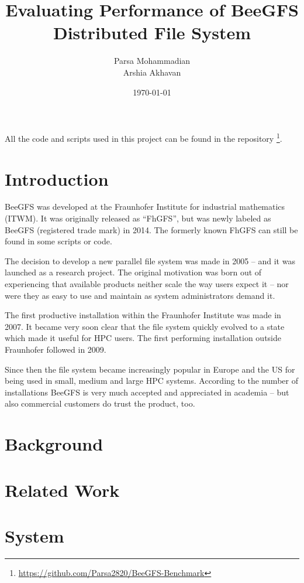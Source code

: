 \documentclass{article}
\title{Evaluating Performance of BeeGFS Distributed File System}
\author{Parsa Mohammadian\\ Arshia Akhavan}
\date{\today}
\begin{document}
\maketitle

\noindent All the code and scripts used in this project can be found in the repository \footnote{\url{https://github.com/Parsa2820/BeeGFS-Benchmark}}.

\tableofcontents

\section{Introduction}
BeeGFS was developed at the Fraunhofer Institute for industrial mathematics (ITWM). It was originally released as “FhGFS”, but was newly labeled as BeeGFS (registered trade mark) in 2014. The formerly known FhGFS can still be found in some scripts or code. \cite{heichler2014introduction}

The decision to develop a new parallel file system was made in 2005 – and it was launched as a research project. The original motivation was born out of experiencing that available products neither scale the way users expect it – nor were they as easy to use and maintain as system administrators demand it. \cite{heichler2014introduction}

The first productive installation within the Fraunhofer Institute was made in 2007. It became very soon clear that the file system quickly evolved to a state which made it useful for HPC users. The first performing installation outside Fraunhofer followed in 2009. \cite{heichler2014introduction}

Since then the file system became increasingly popular in Europe and the US for being used in small, medium and large HPC systems. According to the number of installations BeeGFS is very much accepted and appreciated in academia – but also commercial customers do trust the product, too. \cite{heichler2014introduction}

\section{Background}

\section{Related Work}

\section{System}
\end{document}
